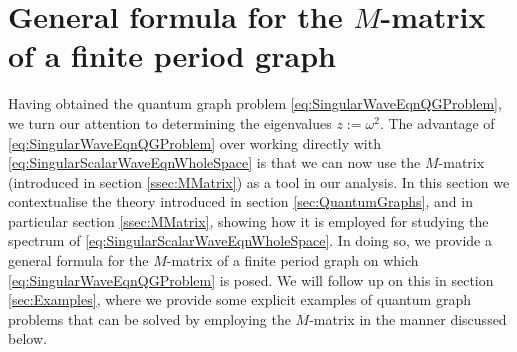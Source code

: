 \section{General formula for the $M$-matrix of a finite period graph} \label{sec:ScalarDiscussion}
Having obtained the quantum graph problem \eqref{eq:SingularWaveEqnQGProblem}, we turn our attention to determining the eigenvalues $z := \omega^2$.
The advantage of \eqref{eq:SingularWaveEqnQGProblem} over working directly with \eqref{eq:SingularScalarWaveEqnWholeSpace} is that we can now use the $M$-matrix (introduced in section \ref{ssec:MMatrix}) as a tool in our analysis.
In this section we contextualise the theory introduced in section \ref{sec:QuantumGraphs}, and in particular section \ref{ssec:MMatrix}, showing how it is employed for studying the spectrum of \eqref{eq:SingularScalarWaveEqnWholeSpace}.
In doing so, we provide a general formula for the $M$-matrix of a finite period graph on which \eqref{eq:SingularWaveEqnQGProblem} is posed.
We will follow up on this in section \ref{sec:Examples}, where we provide some explicit examples of quantum graph problems that can be solved by employing the $M$-matrix in the manner discussed below.

